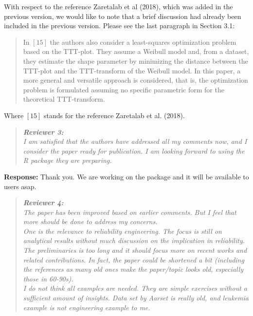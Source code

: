 \documentclass[12pt]{article}
\begin{document}
 With respect to the reference Zaretalab et al (2018), which was added in the previous version, we would like to note that a brief discussion had already been included in the previous version. Please see the last paragraph in Section 3.1:
\begin{quote}
In $[15]$ the authors also consider a least-squares optimization problem based on the TTT-plot. They assume a Weibull model and, from a dataset, they estimate the shape parameter by minimizing the distance between the TTT-plot and the TTT-transform of the Weibull model. In this paper, a more general and versatile approach is considered, that is, the optimization problem is formulated assuming no specific parametric form for the theoretical TTT-transform.
\end{quote}
Where $[15]$  stands for the reference  Zaretalab et al. (2018).

\newpage
\begin{quote}
	\emph{ {\bf Reviewer 3:} \\
I am satisfied that the authors have addressed all my comments now, and I consider the paper ready for publication. 
I am looking forward to using the R package they are preparing.}
\end{quote}

{\bf Response:} Thank you. We are working on the package and it will be available to users asap.

\newpage


\begin{quote}
	\emph{ {\bf Reviewer 4:} \\
The paper has been improved based on earlier comments. But I feel that more should be done to address my concerns.\\
One is the relevance to reliability engineering. The focus is still on analytical results without much discussion on the implication in
reliability. \\
The preliminaries is too long and it should focus more on recent works and related contributions. In fact, the paper could be shortened a bit (including the references as many old ones make the paper/topic looks old, especially those in 60-90s). \\
I do not think all examples are needed. They are simple exercises without a sufficient amount of insights. Data set by Aarset is really
old, and leukemia example is not engineering example to me.
}
\end{quote}
\end{document}
